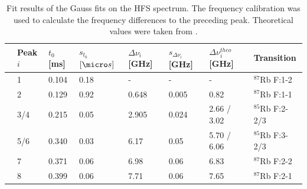 \begin{table}\centering
	\begin{tabular}{@{}llllllll@{}}
		\toprule
		&Peak $i$ &$t_0$ [ms]&$s_{t_0}$ $\unit{}{[\micro s]}$ &$\Delta\nu_{i}$ [GHz]&$s_{\Delta\nu_{i}}$ [GHz]&$\Delta\nu^{theo}_{i}$ [GHz]&Transition\\
		\midrule
		&1&0.104&0.18&-&-&-&$^{87}$Rb F:1-2\\
		&2&0.129&0.92&0.648&0.005&0.82&$^{87}$Rb F:1-1\\
		&3/4&0.215&0.05&2.905&0.024&2.66 / 3.02&$^{85}$Rb F:2-2/3\\
		&5/6&0.340&0.03&6.17&0.05&5.70 / 6.06&$^{85}$Rb F:3-2/3\\
		&7&0.371&0.06&6.98&0.06&6.83&$^{87}$Rb F:2-2\\
		&8&0.399&0.06&7.71&0.06&7.65&$^{87}$Rb F:2-1\\	
		\bottomrule
	\end{tabular}
	\caption[HFS peaks fit results]{Fit results of the Gauss fits on the HFS spectrum. The frequency calibration was used to calculate the frequency differences to the preceding peak. Theoretical values were taken from \cite{staatsex}.}
	\label{tb:HFSresults}
\end{table}
